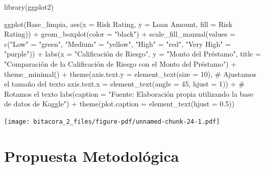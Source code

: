 \documentclass[
  letterpaper,
  DIV=11,
  numbers=noendperiod]{scrreprt}
\newenvironment{Shaded}{\begin{snugshade}}{\end{snugshade}}
\newcommand{\AttributeTok}[1]{\textcolor[rgb]{0.40,0.45,0.13}{#1}}
\newcommand{\CommentTok}[1]{\textcolor[rgb]{0.37,0.37,0.37}{#1}}
\newcommand{\DecValTok}[1]{\textcolor[rgb]{0.68,0.00,0.00}{#1}}
\newcommand{\FloatTok}[1]{\textcolor[rgb]{0.68,0.00,0.00}{#1}}
\newcommand{\FunctionTok}[1]{\textcolor[rgb]{0.28,0.35,0.67}{#1}}
\newcommand{\NormalTok}[1]{\textcolor[rgb]{0.00,0.23,0.31}{#1}}
\newcommand{\OtherTok}[1]{\textcolor[rgb]{0.00,0.23,0.31}{#1}}
\newcommand{\SpecialCharTok}[1]{\textcolor[rgb]{0.37,0.37,0.37}{#1}}
\newcommand{\StringTok}[1]{\textcolor[rgb]{0.13,0.47,0.30}{#1}}
\begin{document}
\begin{Shaded}
\begin{Highlighting}[]
\FunctionTok{library}\NormalTok{(ggplot2)}

\FunctionTok{ggplot}\NormalTok{(Base\_limpia, }\FunctionTok{aes}\NormalTok{(}\AttributeTok{x =} \StringTok{\textasciigrave{}}\AttributeTok{Risk Rating}\StringTok{\textasciigrave{}}\NormalTok{, }\AttributeTok{y =} \StringTok{\textasciigrave{}}\AttributeTok{Loan Amount}\StringTok{\textasciigrave{}}\NormalTok{, }\AttributeTok{fill =} \StringTok{\textasciigrave{}}\AttributeTok{Risk Rating}\StringTok{\textasciigrave{}}\NormalTok{)) }\SpecialCharTok{+}  
  \FunctionTok{geom\_boxplot}\NormalTok{(}\AttributeTok{color =} \StringTok{"black"}\NormalTok{) }\SpecialCharTok{+}  
  \FunctionTok{scale\_fill\_manual}\NormalTok{(}\AttributeTok{values =} \FunctionTok{c}\NormalTok{(}\StringTok{"Low"} \OtherTok{=} \StringTok{"green"}\NormalTok{, }\StringTok{"Medium"} \OtherTok{=} \StringTok{"yellow"}\NormalTok{, }\StringTok{"High"} \OtherTok{=} \StringTok{"red"}\NormalTok{, }\StringTok{"Very High"} \OtherTok{=} \StringTok{"purple"}\NormalTok{)) }\SpecialCharTok{+}  
  \FunctionTok{labs}\NormalTok{(}\AttributeTok{x =} \StringTok{"Calificación de Riesgo"}\NormalTok{, }\AttributeTok{y =} \StringTok{"Monto del Préstamo"}\NormalTok{, }\AttributeTok{title =} \StringTok{"Comparación de la Calificación de Riesgo con el Monto del Préstamo"}\NormalTok{) }\SpecialCharTok{+} 
  \FunctionTok{theme\_minimal}\NormalTok{() }\SpecialCharTok{+}
  \FunctionTok{theme}\NormalTok{(}\AttributeTok{axis.text.y =} \FunctionTok{element\_text}\NormalTok{(}\AttributeTok{size =} \DecValTok{10}\NormalTok{), }\CommentTok{\# Ajustamos el tamaño del texto}
        \AttributeTok{axis.text.x =} \FunctionTok{element\_text}\NormalTok{(}\AttributeTok{angle =} \DecValTok{45}\NormalTok{, }\AttributeTok{hjust =} \DecValTok{1}\NormalTok{))  }\SpecialCharTok{+} \CommentTok{\# Rotamos el texto }
\FunctionTok{labs}\NormalTok{(}\AttributeTok{caption =} \StringTok{"Fuente: Elaboración propia utilizando la base de datos de Kaggle"}\NormalTok{) }\SpecialCharTok{+}
\FunctionTok{theme}\NormalTok{(}\AttributeTok{plot.caption =} \FunctionTok{element\_text}\NormalTok{(}\AttributeTok{hjust =} \FloatTok{0.5}\NormalTok{)) }
\end{Highlighting}
\end{Shaded}

\texttt{[image: bitacora\_2\_files/figure-pdf/unnamed-chunk-24-1.pdf]}

\section{Propuesta Metodológica}\label{propuesta-metodoluxf3gica}
\end{document}
